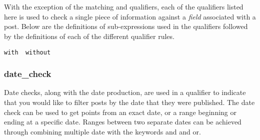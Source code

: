 \begin{description}[labelindent=1cm,leftmargin=\onelen,labelwidth=1cm]
    \\
  \myitem{}{\textbf{\textbar}}  \\
  \myitem{}{\textbf{\textbar}}  \\
  \myitem{}{\textbf{\textbar}}  \\
  \myitem{}{\textbf{\textbar}}  \\
  \myitem{}{\textbf{\textbar}}  \\
  \myitem{}{\textbf{\textbar}}  \\
\end{description}

With the exception of the matching and  qualifiers, each of the qualifiers listed here is used to check a single piece of
information against a \textit{field} associated with a post. Below are the definitions of sub-expressions used in the qualifiers followed
by the definitions of each of the different  qualifier rules.
\begin{description}[labelindent=1cm,leftmargin=\onelen,labelwidth=1cm]
     \texttt{with \textbf{\textbar} without}
\end{description}

\subsubsection{date\_check}
Date checks, along with the date production, are used in a qualifier to indicate that you would like to filter posts by the date that
they were published. The date check can be used to get points from an exact date, or a range beginning or ending at a specific date.
Ranges between two separate dates can be achieved through combining multiple date  with the keywords and and or.


